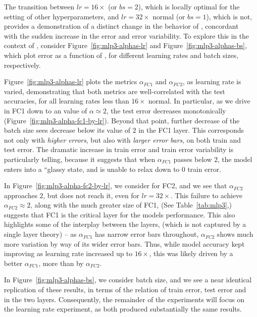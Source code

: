 The transition between $lr=16\times$ (or $bs=2$), which is locally optimal for the setting of other hyperparameters, and $lr=32\times$ normal (or $bs=1$), which is not, provides a demonstration of a distinct change in the behavior of \ALPHA, concordant with the sudden increase in the error and error variability. 
To explore this in the context of \SETOL, consider Figure~\ref{fig:mlp3-alphas-lr} and Figure~\ref{fig:mlp3-alphas-bs}, which plot error as a function of \ALPHA, for different learning rates and batch sizes, respectively.

Figure~\ref{fig:mlp3-alphas-lr} plots the \ALPHA metrics $\alpha_{FC1}$ and $\alpha_{FC2}$, as learning rate is varied, demonstrating that both metrics are well-correlated with the test accuracies, for all learning rates less than $16\times$ normal. 
In particular, as we drive \ALPHA in FC1 down to an \Ideal value of $\alpha\simeq 2$, the test error decreases monotonically (Figure~\ref{fig:mlp3-alpha-fc1-by-lr}).
Beyond that point, further decrease of the batch size sees \ALPHA decrease below its \Ideal value of $2$ in the FC1 layer.
This corresponds not only with \emph{higher errors}, but also with \emph{larger error bars}, on both train and test error. 
The dramatic increase in train error and train error variability is particularly telling, because it suggests that when 
$\alpha_{FC1}$ passes below $2$, the model enters into a ``glassy state, and is unable to relax down to $0$ train error.

In Figure~\ref{fig:mlp3-alpha-fc2-by-lr}, we consider \ALPHA for FC2, and we see that $\alpha_{FC2}$ approaches $2$, but 
does not reach it, even for $lr=32\times$. This failure to achieve $\alpha_{FC2} \approx 2$, along with the much greater size 
of FC1, (See Table~\ref{tab:mlp3},) suggests that FC1 is the critical layer for the models performance. 
This also highlights some of the interplay between the layers, (which is not captured by a single layer theory) -- as $\alpha_{FC1}$ has narrow error bars throughout, $\alpha_{FC2}$ shows much more variation by way of its wider error bars. 
Thus, while model accuracy kept improving as learning rate increased up to $16\times$, this was likely driven by a better $\alpha_{FC1}$, more than by $\alpha_{FC2}$. 

In Figure~\ref{fig:mlp3-alphas-bs}, we consider batch size, and we see a near identical replication of these results, in terms of the relation of train error, test error and \ALPHA in the two layers. 
Consequently, the remainder of the experiments will focus on the learning rate experiment, as both produced substantially the same results.

